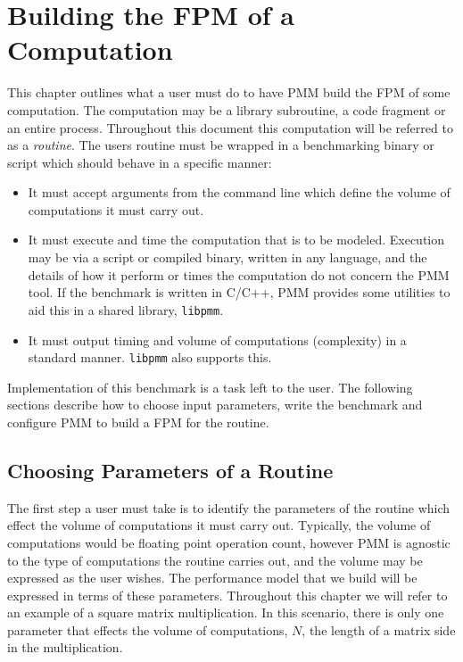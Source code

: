 \documentclass[a4paper,12pt]{report}
\begin{document}
    \chapter{Building the FPM of a Computation}
    \label{bench_chap}
    This chapter outlines what a user must do to have PMM build the FPM of some
    computation. The computation may be a library subroutine, a code
    fragment or an entire process. Throughout this document this computation
    will be referred to as a \emph{routine}. The users routine must be wrapped
    in a benchmarking binary or script which should behave in a specific
    manner:

    \begin{itemize}
        \item It must accept arguments from the command line which define
            the volume of computations it must carry out.
        \item It must execute and time the computation that is to be modeled.
            Execution may be via a script or compiled binary, written in any
            language, and the details of how it perform or times the
            computation do not concern the PMM tool. If the benchmark is written
            in C/C++, PMM provides some utilities to aid this in a shared
            library, \verb+libpmm+.
        \item It must output timing and volume of computations (complexity) in
            a standard manner. \verb+libpmm+ also supports this.
    \end{itemize}

    Implementation of this benchmark is a task left to the user. The following
    sections describe how to choose input parameters, write the benchmark and
    configure PMM to build a FPM for the routine.

    \section{Choosing Parameters of a Routine}

    The first step a user must take is to identify the parameters of the
    routine which effect the volume of computations it must carry out.
    Typically, the volume of computations would be floating point operation
    count, however PMM is agnostic to the type of computations the routine
    carries out, and the volume may be expressed as the user wishes.
    The performance model that we build will be expressed in terms of these
    parameters. Throughout this chapter we will refer to an example of a square
    matrix multiplication. In this scenario, there is only one parameter that
    effects the volume of computations, $N$, the length of a matrix side in the
    multiplication.
\end{document}
